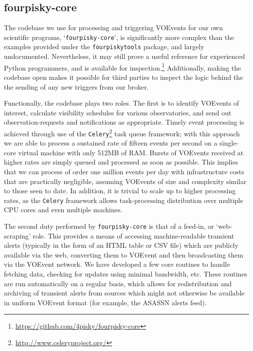 \documentclass[5p,authoryear]{elsarticle}
\begin{document}
\subsection{fourpisky-core}
The codebase we use for processing and triggering VOEvents for our own scientific programs, `\texttt{fourpisky-core}', is significantly more complex than the examples provided under the \texttt{fourpiskytools} package, and largely undocumented. 
Nevertheless, it may still prove a useful reference for experienced Python programmers, and is available for inspection.\footnote{\url{https://github.com/4pisky/fourpisky-core}}
Additionally, making the codebase open makes it possible for third parties to inspect the logic behind the the sending of any new triggers from our broker.

Functionally, the codebase plays two roles. 
The first is to identify VOEvents of interest, calculate visibility schedules for various observatories, and send out observation-requests and notifications as appropriate. 
Timely event processing is achieved through use of the \texttt{Celery}\footnote{\url{http://www.celeryproject.org/}} task queue framework; with this approach we are able to process a sustained rate of fifteen events per second on a single-core virtual machine with only 512MB of RAM. 
Bursts of VOEvents received at higher rates are simply queued and processed as soon as possible.
This implies that we can process of order one million events per day with infrastructure costs that are practically negligible, assuming VOEvents of size and complexity similar to those seen to date.
In addition, it is trivial to scale up to higher processing rates, as the \texttt{Celery} framework allows task-processing distribution over multiple CPU cores and even multiple machines.

The second duty performed by \texttt{fourpisky-core} is that of a feed-in, or `web-scraping' role. 
This provides a means of accessing machine-readable transient alerts (typically in the form of an HTML table or CSV file) which are publicly available via the web, converting them to VOEvent and then broadcasting them via the VOEvent network.
We have developed a few core routines to handle fetching data, checking for updates using minimal bandwidth, etc. 
These routines are run automatically on a regular basis, which allows for redistribution and archiving of transient alerts from sources which might not otherwise be available in uniform VOEvent format (for example, the ASASSN alerts feed).
\end{document}
